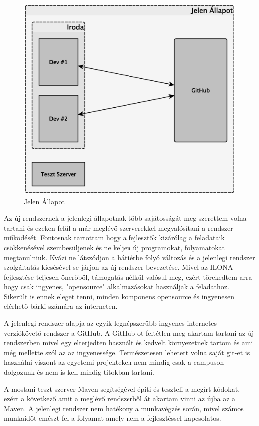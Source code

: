 \begin{figure}[h]
	\centering
	\includegraphics[width=0.7\linewidth]{figures/jelenallapot}
	\caption{Jelen Állapot}
	\label{fig:jelenallapot}
\end{figure}

Az új rendszernek a jelenlegi állapotnak több sajátosságát meg szerettem volna tartani és ezeken felül a már meglévő szerverekkel megvalósítani a rendszer működését. 
Fontosnak tartottam hogy a fejlesztők kizárólag a feladataik csökkenésével szembesüljenek és ne keljen új programokat, folyamatokat megtanulniuk. 
Kvázi ne látszódjon a háttérbe folyó változás és a jelenlegi rendszer szolgáltatás kiesésével se járjon az új rendszer bevezetése. 
Mivel az ILONA fejlesztése teljesen önerőből, támogatás nélkül valósul meg, ezért törekedtem arra hogy csak ingyenes, "opensource" alkalmazásokat használjak a feladathoz. 
Sikerült is ennek eleget tenni, minden komponens opensource és ingyenesen elérhető bárki számára az interneten.
--------------

A jelenlegi rendszer alapja az egyik legnépszerűbb ingyenes internetes verziókövető rendszer a GitHub. 
A GitHub-ot feltétlen meg akartam tartani az új rendszerben mivel egy elterjedten használt és kedvelt környezetnek tartom és ami még mellette szól az az ingyenessége. 
Természetesen lehetett volna saját git-et is használni viszont az egyetemi projekteken nem mindig csak a campuson dolgozunk és nem is kell mindig titokban tartani.
--------------

A mostani teszt szerver Maven segítségével építi és teszteli a megírt kódokat, ezért a következő amit a meglévő rendszerből át akartam vinni az újba az a Maven. 
A jelenlegi rendszer nem hatékony a munkavégzés során, mivel számos munkaidőt emészt fel a folyamat amely nem a fejlesztéssel kapcsolatos. 
--------------
\pagebreak
